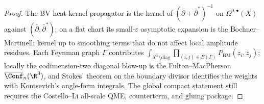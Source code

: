 \begin{proof}
The BV heat-kernel propagator is the kernel of $(\bar\partial +
\bar\partial^*)^{-1}$ on $\Omega^{0,\bullet}(X)$ against
$(\bar\partial,\bar\partial^*)$; on a flat chart its small-$\varepsilon$
asymptotic expansion is the Bochner--Martinelli kernel up to smoothing
terms that do not affect local amplitude residues. Each Feynman graph
$\Gamma$ contributes
$\int_{X^n\setminus\mathrm{diag}}\prod_{(i,j)\in E(\Gamma)}
P_{\mathrm{BM}}(z_i,z_j)$; locally the codimension-two diagonal blow-up
is the Fulton--MacPherson $\overline{\Conf}_n(\R^3)$, and Stokes'
theorem on the boundary divisor identifies the weights with
Kontsevich's angle-form integrals. The global compact statement still
requires the Costello--Li all-scale QME, counterterm, and gluing package.
\end{proof}

